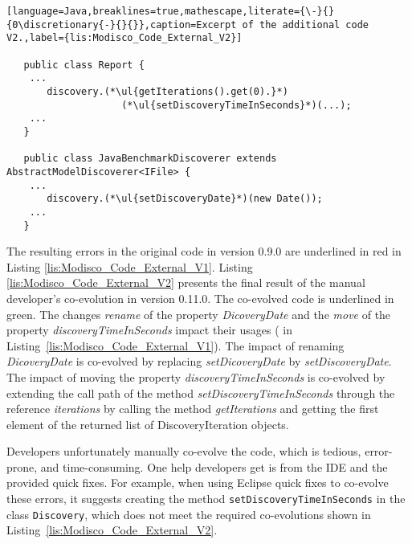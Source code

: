 \begin{lstlisting}[language=Java,breaklines=true,mathescape,literate={\-}{}{0\discretionary{-}{}{}},caption=Excerpt of the additional code V2.,label={lis:Modisco_Code_External_V2}]
  
   public class Report {
    ...
       discovery.(*\ul{getIterations().get(0).}*) 
                    (*\ul{setDiscoveryTimeInSeconds}*)(...);
    ...
   }
   
   public class JavaBenchmarkDiscoverer extends AbstractModelDiscoverer<IFile> {
    ...
       discovery.(*\ul{setDiscoveryDate}*)(new Date());
    ...
   }
\end{lstlisting}




The resulting errors in the original code in version 0.9.0 are underlined in red in Listing \ref{lis:Modisco_Code_External_V1}. Listing \ref{lis:Modisco_Code_External_V2} presents the final result of the manual developer's co-evolution in version 0.11.0. The co-evolved code is underlined in green. 
The changes \textit{rename} of the property \textit{ DicoveryDate} and the \textit{move} of the property \emph{discoveryTimeInSeconds} impact their usages ({\small{}} in Listing~\ref{lis:Modisco_Code_External_V1}). The impact of renaming \textit{ DicoveryDate} is co-evolved by replacing \textit{setDicoveryDate} by \textit{setDiscoveryDate}. The impact of moving the property \emph{discoveryTimeInSeconds} is co-evolved by extending the call path of the method \emph{setDiscoveryTimeInSeconds} through the reference \textit{iterations} by calling the method \textit{getIterations} and getting the first element of the returned list of DiscoveryIteration objects.

Developers unfortunately manually co-evolve the code, which is tedious, error-prone, and time-consuming. 
One help developers get is from the IDE and the provided quick fixes. For example, when using Eclipse quick fixes to co-evolve these errors, it suggests creating the method \texttt{setDiscoveryTimeInSeconds} in the class \texttt{Discovery}, which does not meet the required co-evolutions shown in Listing~\ref{lis:Modisco_Code_External_V2}.

